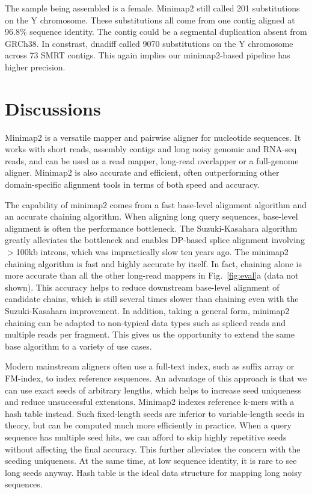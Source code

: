 \documentclass{bioinfo}
\begin{document}
The sample being assembled is a female. Minimap2 still called 201 substitutions
on the Y chromosome. These substitutions all come from one contig aligned at
96.8\% sequence identity. The contig could be a segmental duplication
absent from GRCh38. In constrast, dnadiff called 9070 substitutions on the Y
chromosome across 73 SMRT contigs. This again implies our minimap2-based
pipeline has higher precision.

\section{Discussions}

Minimap2 is a versatile mapper and pairwise aligner for nucleotide sequences.
It works with short reads, assembly contigs and long noisy genomic and RNA-seq
reads, and can be used as a read mapper, long-read overlapper or a full-genome
aligner. Minimap2 is also accurate and efficient, often outperforming other
domain-specific alignment tools in terms of both speed and accuracy.

The capability of minimap2 comes from a fast base-level alignment algorithm and
an accurate chaining algorithm. When aligning long query sequences, base-level
alignment is often the performance bottleneck. The Suzuki-Kasahara algorithm
greatly alleviates the bottleneck and enables DP-based splice alignment
involving $>$100kb introns, which was impractically slow ten years ago.  The
minimap2 chaining algorithm is fast and highly accurate by itself.  In fact,
chaining alone is more accurate than all the other long-read mappers in
Fig.~\ref{fig:eval}a (data not shown). This accuracy helps to reduce downstream
base-level alignment of candidate chains, which is still several times slower than
chaining even with the Suzuki-Kasahara improvement. In addition, taking a
general form, minimap2 chaining can be adapted to non-typical data types such as
spliced reads and multiple reads per fragment. This gives us the opportunity to
extend the same base algorithm to a variety of use cases.

Modern mainstream aligners often use a full-text index, such as suffix array or
FM-index, to index reference sequences. An advantage of this approach is that
we can use exact seeds of arbitrary lengths, which helps to increase seed
uniqueness and reduce unsuccessful extensions. Minimap2 indexes reference
k-mers with a hash table instead. Such fixed-length seeds are inferior to
variable-length seeds in theory, but can be computed much more efficiently in
practice. When a query sequence has multiple seed hits, we can afford to skip
highly repetitive seeds without affecting the final accuracy. This further
alleviates the concern with the seeding uniqueness. At the same time, at low
sequence identity, it is rare to see long seeds anyway. Hash table is the ideal
data structure for mapping long noisy sequences.
\end{document}
